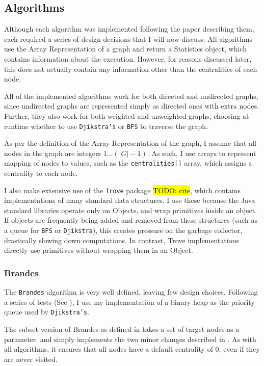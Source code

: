\documentclass[12pt,a4paper,twoside,openright]{report}
\newcommand{\todo}[1]{\hl{TODO: #1}}
\newcommand{\ttt}[1]{\texttt{#1}}
\begin{document}
		\subsection{Algorithms}
			Although each algorithm was implemented following the paper describing them, each required a series of design decisions that I will now discuss. All algorithms use the Array Representation of a graph and return a Statistics object, which contains information about the execution. However, for reasons discussed later, this does not actually contain any information other than the centralities of each node.
			
			All of the implemented algorithms work for both directed and undirected graphs, since undirected graphs are represented simply as directed ones with extra nodes. Further, they also work for both weighted and unweighted graphs, choosing at runtime whether to use \ttt{Djikstra's} or \ttt{BFS} to traverse the graph.
			
			As per the definition of the Array Representation of the graph, I assume that all nodes in the graph are integers $1\dots(|G|-1)$. As such, I use arrays to represent mapping of nodes to values, such as the \ttt{centralities[]} array, which assigns a centrality to each node.
			
			I also make extensive use of the \ttt{Trove} package \todo{cite}, which contains implementations of many standard data structures. I use these because the Java standard libraries operate only on Objects, and wrap primitives inside an object. If objects are frequently being added and removed from these structures (such as a queue for \ttt{BFS} or \ttt{Djikstra}), this creates pressure on the garbage collector, drastically slowing down computations. In contrast, Trove implementations directly use primitives without wrapping them in an Object.
			
			\subsubsection{Brandes}
			
				The \ttt{Brandes} algorithm is very well defined, leaving few design choices. Following a series of tests (See ), I use my implementation of a binary heap as the priority queue used by \ttt{Djikstra's}.
				
				The subset version of Brandes as defined in \cite{erdos} takes a set of target nodes as a parameter, and simply implements the two minor changes described in . As with all algorithms, it ensures that all nodes have a default centrality of 0, even if they are never visited.
				
\end{document}
